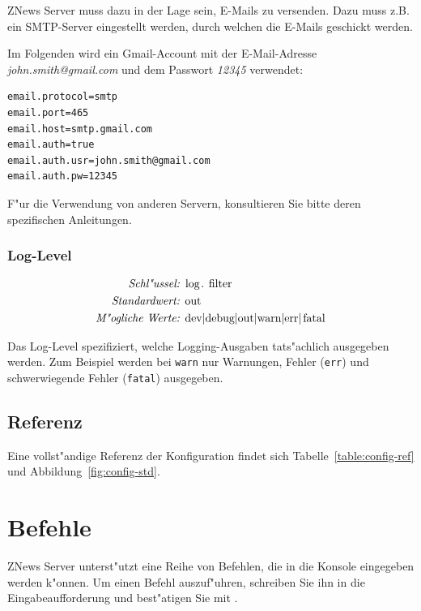 \documentclass[12pt]{article}
\providecommand\meta[1]{\textlangle{\itshape #1\/}\textrangle}
\begin{document}
    ZNews Server muss dazu in der Lage sein, E-Mails
    zu versenden. Dazu muss z.B. ein SMTP-Server eingestellt
    werden, durch welchen die E-Mails geschickt werden.

    Im Folgenden wird ein Gmail-Account mit der
    E-Mail-Adresse \emph{john.smith@gmail.com} und
    dem Passwort \emph{12345} verwendet:

    \begin{lstlisting}[]%@formatter:off
email.protocol=smtp
email.port=465
email.host=smtp.gmail.com
email.auth=true
email.auth.usr=john.smith@gmail.com
email.auth.pw=12345
    \end{lstlisting}%

    F"ur die Verwendung von anderen Servern, konsultieren Sie
    bitte deren spezifischen Anleitungen.

    \subsubsection{Log-Level}

    \begin{align*}
        \emph{Schl"ussel: } & \lstinline{log.filter}\\
        \emph{Standardwert: } & \lstinline{out}\\
        \emph{M"ogliche Werte: } & \lstinline{dev|debug|out|warn|err|fatal}
    \end{align*}

    Das Log-Level spezifiziert, welche Logging-Ausgaben tats"achlich
    ausgegeben werden. Zum Beispiel werden bei \lstinline{warn}
    nur Warnungen, Fehler (\lstinline{err}) und schwerwiegende Fehler
    (\lstinline{fatal}) ausgegeben.

    \subsection{Referenz}

    Eine vollst"andige Referenz der Konfiguration
    findet sich Tabelle~\ref{table:config-ref}
    und Abbildung~\ref{fig:config-std}.

    \section{Befehle}

    ZNews Server unterst"utzt eine Reihe von Befehlen,
    die in die Konsole eingegeben werden k"onnen.
    Um einen Befehl auszuf"uhren, schreiben Sie ihn
    in die Eingabeaufforderung und best"atigen Sie
    mit \meta{Enter}.
\end{document}
